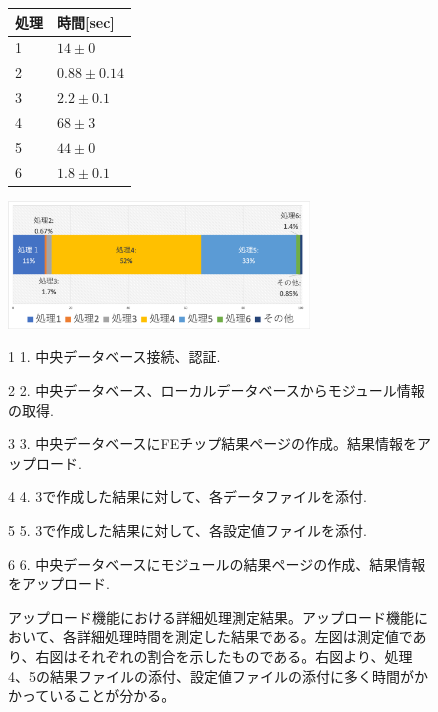 \begin{figure}
\begin{minipage}{0.4\textwidth}
\begin{center}
\makeatletter
\def\@captype{table}
\makeatother
\begin{tabular}{|ll|} \hline
  処理 & 時間[sec] \\ \hline
  1 & $ 14 \pm 0 $ \\  
  2 & $ 0.88 \pm 0.14 $ \\  
  3 & $ 2.2 \pm  0.1 $ \\  
  4 & $ 68 \pm 3 $ \\  
  5 & $ 44 \pm 0 $ \\ 
  6 & $ 1.8 \pm 0.1 $ \\ \hline  
\end{tabular}
\end{center}
\end{minipage}
\begin{minipage}{0.5\textwidth}
\begin{center}
\includegraphics[width=8cm]{./upload_process_detail_gragh.png}
\end{center}
\end{minipage}
\scriptsize
\begin{tablenotes}
\item[1] 1. 中央データベース接続、認証.
\item[2] 2. 中央データベース、ローカルデータベースからモジュール情報の取得.   
\item[3] 3. 中央データベースにFEチップ結果ページの作成。結果情報をアップロード. 
\item[4] 4. 3で作成した結果に対して、各データファイルを添付.  
\item[5] 5. 3で作成した結果に対して、各設定値ファイルを添付.   
\item[6] 6. 中央データベースにモジュールの結果ページの作成、結果情報をアップロード.  
\end{tablenotes}
\caption[アップロード機能における詳細処理測定結果]{アップロード機能における詳細処理測定結果。アップロード機能において、各詳細処理時間を測定した結果である。左図は測定値であり、右図はそれぞれの割合を示したものである。右図より、処理4、5の結果ファイルの添付、設定値ファイルの添付に多く時間がかかっていることが分かる。}
\label{upload_process_detail_result}
\end{figure}

